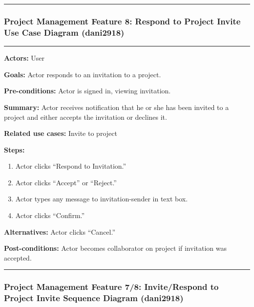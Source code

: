\documentclass[twoside,letterpaper]{article}
\begin{document}
\vspace{8pt}
\hrule
\newpage



\subsubsection[Project Management Feature 8: Respond to Project Invite Use Case Diagram (dani2918)]{\rmfamily\bfseries\color{black}
	Project Management Feature 8: Respond to Project Invite Use Case Diagram (dani2918)}
\hypertarget{RefHeading22059017292}{}
\bigskip

\vspace{2pt}
\hrule
\vspace{8pt}
\noindent \textbf{Actors:} User  \newline

\noindent \textbf{Goals:} Actor responds to an invitation to a project.\newline

\noindent  \textbf{Pre-conditions:} Actor is signed in, viewing invitation.  \newline

\noindent \textbf{Summary:} Actor receives notification that he or she has been invited to a project and either accepts the invitation or declines it. \newline

\noindent \textbf{Related use cases:} Invite to project \newline

\noindent \textbf{Steps:} \begin{enumerate}
  \item Actor clicks ``Respond to Invitation.''
  \item Actor clicks ``Accept'' or ``Reject.''
  \item Actor types any message to invitation-sender in text box.
  \item Actor clicks ``Confirm.''
 \end{enumerate}
 
\noindent  \textbf{Alternatives:} Actor clicks ``Cancel.'' \newline

\noindent  \textbf{Post-conditions:} Actor becomes collaborator on project if invitation was accepted. \newline
\vspace{8pt}
\hrule
\vspace{20pt} \newpage

\subsubsection[Project Management Feature 7/8: Invite/Respond to Project Invite Sequence Diagram (dani2918)]{\rmfamily\bfseries\color{black}
	Project Management Feature 7/8:  Invite/Respond to Project Invite Sequence Diagram (dani2918)}
\label{pm:sd5}
\bigskip
\end{document}
